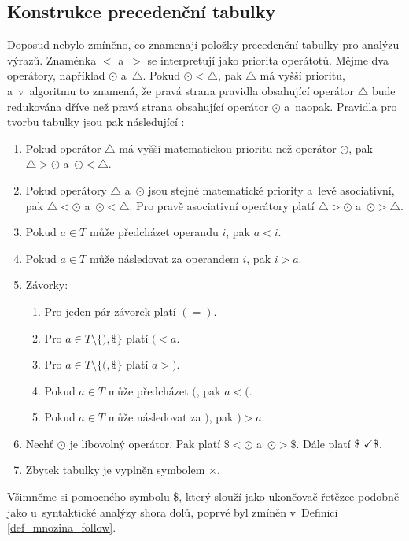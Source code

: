 \subsection*{Konstrukce precedenční tabulky}
Doposud nebylo zmíněno, co znamenají položky precedenční tabulky pro analýzu výrazů.
Znaménka $<$ a~$>$ se interpretují jako priorita operátotů.
Mějme dva operátory, například $\odot$ a~$\bigtriangleup$.
Pokud $\odot < \bigtriangleup$, pak $\bigtriangleup$ má vyšší prioritu, a~v~algoritmu to znamená, že pravá strana pravidla obsahující operátor $\bigtriangleup$ bude redukována dříve než pravá strana obsahující operátor $\odot$ a~naopak.
Pravidla pro tvorbu tabulky jsou pak následující \cite{medunaElementsOfCompDesign,meduna2017sa-zdola-nahoru}:
\begin{enumerate}
    \item Pokud operátor $\bigtriangleup$ má vyšší matematickou prioritu než operátor $\odot$, pak $\bigtriangleup > \odot$ a~$\odot < \bigtriangleup$.
    \item Pokud operátory $\bigtriangleup$ a~$\odot$ jsou stejné matematické priority a~levě asociativní, pak $\bigtriangleup < \odot$ a~$\odot < \bigtriangleup$.
    Pro pravě asociativní operátory platí $\bigtriangleup > \odot$ a~$\odot > \bigtriangleup$.
    \item Pokud $a \in T$ může předcházet operandu $i$, pak $a < i$.
    \item Pokud $a \in T$ může následovat za operandem $i$, pak $i > a$.
    \item Závorky:
    \begin{enumerate}
        \item Pro jeden pár závorek platí $(=)$.
        \item Pro $a \in T \setminus \{) ,\$\}$ platí $( < a$.
        \item Pro $a \in T \setminus\{(, \$\}$ platí $a > )$.
        \item Pokud $a \in T$ může předcházet $($, pak $a < ($. 
        \item Pokud $a \in T$ může následovat za $)$, pak $) > a$.
    \end{enumerate}
    \item Nechť $\odot$ je libovolný operátor.
    Pak platí $\$ < \odot$ a~$\odot > \$$.
    Dále platí $\$ \text{ \checkmark } \$$.
    \item Zbytek tabulky je vyplněn symbolem $\times$.
\end{enumerate}
Všimněme si pomocného symbolu \$, který slouží jako ukončovač řetězce podobně jako u~syntaktické analýzy shora dolů, poprvé byl zmíněn v~Definici \ref{def_mnozina_follow}.

